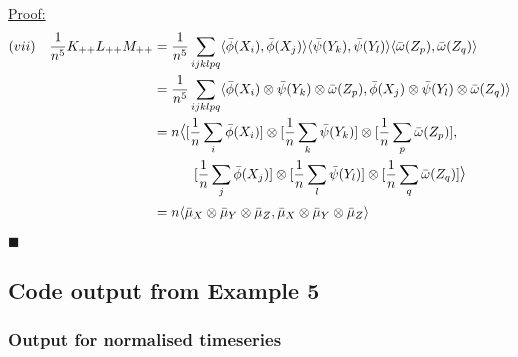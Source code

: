 \documentclass[12pt]{article}
\newenvironment{claimproof}[1]{\par\noindent\underline{Proof:}\space#1}{\hfill $\blacksquare$}
\numberwithin{claim}{section}
\numberwithin{lemma}{section}
\numberwithin{theorem}{section}
\begin{document}
\begin{claimproof}
\begin{align*}
(vii) && \frac{1}{n^5}K_{++}L_{++}M_{++} &= \frac{1}{n^5} \sum_{ijklpq} \langle \bar{\phi}(X_i),\bar{\phi}(X_j) \rangle  \langle \bar{\psi}(Y_k),\bar{\psi}(Y_l) \rangle  \langle \bar{\omega}(Z_p),\bar{\omega}(Z_q) \rangle\\
&&& =\frac{1}{n^5} \sum_{ijklpq} \langle \bar{\phi}(X_i)\otimes\bar{\psi}(Y_k) \otimes  \bar{\omega}(Z_p),\bar{\phi}(X_j)\otimes \bar{\psi}(Y_l) \otimes \bar{\omega}(Z_q) \rangle\\
&&& = n  \mathlarger{\langle} [\frac{1}{n} \sum_{i}\bar{\phi}(X_i)]\otimes[\frac{1}{n} \sum_{k}\bar{\psi}(Y_k)] \otimes  [\frac{1}{n} \sum_{p} \bar{\omega}(Z_p)], \\
&&& \quad \quad \quad [\frac{1}{n}\sum_{j}\bar{\phi}(X_j)]\otimes  [\frac{1}{n} \sum_l \bar{\psi}(Y_l)] \otimes[\frac{1}{n} \sum_q  \bar{\omega}(Z_q)]\mathlarger{\rangle}\\
&&& = n\langle \bar{\mu}_X \otimes \bar{\mu}_Y  \otimes\bar{\mu}_Z ,\bar{\mu}_X \otimes \bar{\mu}_Y  \otimes\bar{\mu}_Z  \rangle\\
\end{align*}

\end{claimproof}


\newpage

\subsection{Code output from Example 5}
\subsubsection{Output for normalised timeseries}
\end{document}
